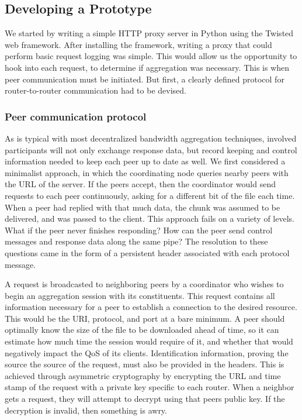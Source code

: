 \documentclass[12pt]{article}
\begin{document}
	\subsection{Developing a Prototype}

		We started by writing a simple HTTP proxy server in Python using the Twisted web framework. After installing the framework, writing a proxy that could perform basic request logging was simple. This would allow us the opportunity to hook into each request, to determine if aggregation was necessary. This is when peer communication must be initiated. But first, a clearly defined protocol for router-to-router communication had to be devised.


		\subsubsection{Peer communication protocol}

			As is typical with most decentralized bandwidth aggregation techniques, involved participants will not only exchange response data, but record keeping and control information needed to keep each peer up to date as well. We first considered a minimalist approach, in which the coordinating node queries nearby peers with the URL of the server. If the peers accept, then the coordinator would send requests to each peer continuously, asking for a different bit of the file each time. When a peer had replied with that much data, the chunk was assumed to be delivered, and was passed to the client. This approach fails on a variety of levels. What if the peer never finishes responding? How can the peer send control messages and response data along the same pipe? The resolution to these questions came in the form of a persistent header associated with each protocol message.

			A request is broadcasted to neighboring peers by a coordinator who wishes to begin an aggregation session with its constituents. This request contains all information necessary for a peer to establish a connection to the desired resource. This would be the URI, protocol, and port at a bare minimum. A peer should optimally know the size of the file to be downloaded ahead of time, so it can estimate how much time the session would require of it, and whether that would negatively impact the QoS of its clients. Identification information, proving the source the source of the request, must also be provided in the headers. This is achieved through asymmetric cryptography by encrypting the URL and time stamp of the request with a private key specific to each router. When a neighbor gets a request, they will attempt to decrypt using that peers public key. If the decryption is invalid, then something is awry.
\end{document}
